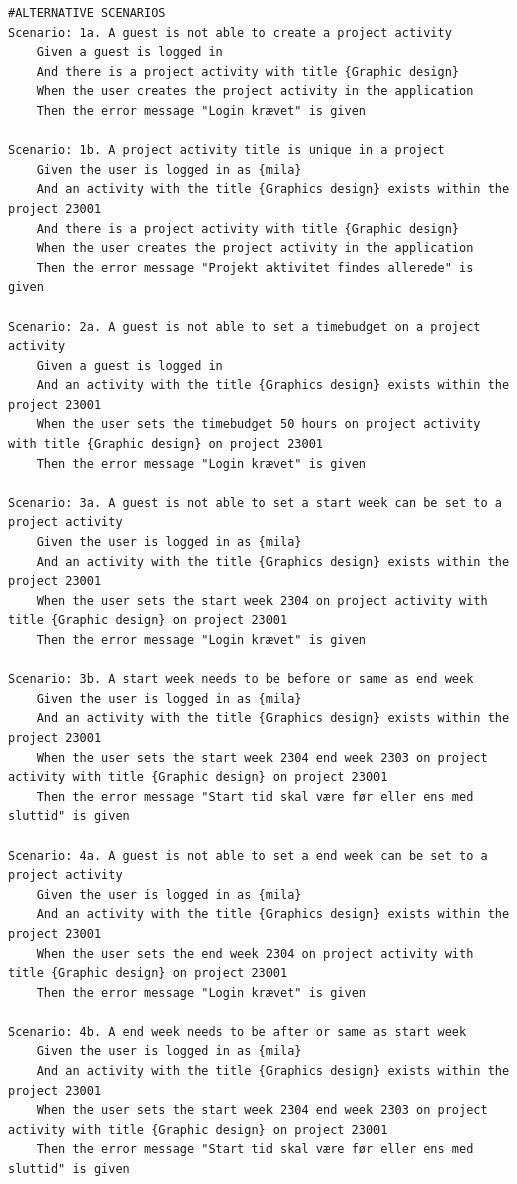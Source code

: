 \begin{listing}[H]
\begin{verbatim}
#ALTERNATIVE SCENARIOS
Scenario: 1a. A guest is not able to create a project activity
    Given a guest is logged in
    And there is a project activity with title {Graphic design}  
    When the user creates the project activity in the application 
    Then the error message "Login krævet" is given

Scenario: 1b. A project activity title is unique in a project
    Given the user is logged in as {mila}
    And an activity with the title {Graphics design} exists within the project 23001
    And there is a project activity with title {Graphic design}  
    When the user creates the project activity in the application 
    Then the error message "Projekt aktivitet findes allerede" is given

Scenario: 2a. A guest is not able to set a timebudget on a project activity
    Given a guest is logged in
    And an activity with the title {Graphics design} exists within the project 23001
    When the user sets the timebudget 50 hours on project activity with title {Graphic design} on project 23001
    Then the error message "Login krævet" is given

Scenario: 3a. A guest is not able to set a start week can be set to a project activity
    Given the user is logged in as {mila}
    And an activity with the title {Graphics design} exists within the project 23001
    When the user sets the start week 2304 on project activity with title {Graphic design} on project 23001
    Then the error message "Login krævet" is given

Scenario: 3b. A start week needs to be before or same as end week
    Given the user is logged in as {mila}
    And an activity with the title {Graphics design} exists within the project 23001
    When the user sets the start week 2304 end week 2303 on project activity with title {Graphic design} on project 23001
    Then the error message "Start tid skal være før eller ens med sluttid" is given

Scenario: 4a. A guest is not able to set a end week can be set to a project activity
    Given the user is logged in as {mila}
    And an activity with the title {Graphics design} exists within the project 23001
    When the user sets the end week 2304 on project activity with title {Graphic design} on project 23001
    Then the error message "Login krævet" is given

Scenario: 4b. A end week needs to be after or same as start week
    Given the user is logged in as {mila}
    And an activity with the title {Graphics design} exists within the project 23001
    When the user sets the start week 2304 end week 2303 on project activity with title {Graphic design} on project 23001
    Then the error message "Start tid skal være før eller ens med sluttid" is given

    \end{verbatim}
\end{listing}



